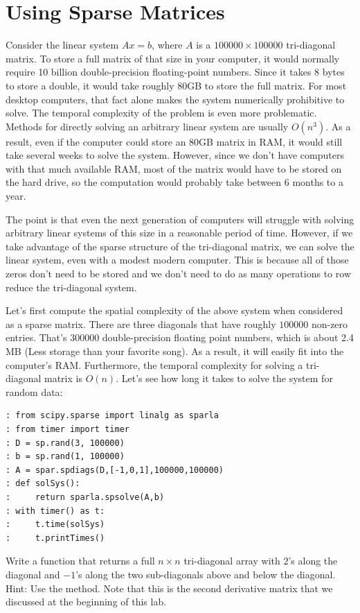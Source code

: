 \section*{Using Sparse Matrices}
Consider the linear system $A x = b$, where $A$ is a
 $100000\times 100000$ tri-diagonal matrix.  To store a full
matrix of that size in your computer, it would normally require 10
billion double-precision floating-point numbers.  Since it takes 8
bytes to store a double, it would take roughly 80GB to store the
full matrix.  For most desktop computers, that fact alone makes the
system numerically prohibitive to solve. 
The temporal complexity of the problem is even more problematic. 
Methods for directly solving an arbitrary linear system are usually $O(n^3)$.  
As a result, even if the computer could store an 80GB matrix in RAM, it
would still take several weeks to solve the system.  However, since
we don't have computers with that much available RAM, most of the
matrix would have to be stored on the hard drive, so the computation
would probably take between $6$ months to a year.

The point is that even the next generation of computers will
struggle with solving arbitrary linear systems of this size in a
reasonable period of time.  However, if we take advantage of the
sparse structure of the tri-diagonal matrix, we can solve the linear
system, even with a modest modern computer.  This is because all of
those zeros don't need to be stored and we don't need to do as many
operations to row reduce the tri-diagonal system.

Let's first compute the spatial complexity of the above system when
considered as a sparse matrix.  There are three diagonals that have
roughly $100000$ non-zero entries.  That's $300000$
double-precision floating point numbers, which is about 2.4 MB (Less
storage than your favorite song).  As a result, it will easily
fit into the computer's RAM.  Furthermore, the temporal complexity for solving
a tri-diagonal matrix is $O(n)$. Let's see how long it takes to
solve the system for random data:
\begin{lstlisting}
: from scipy.sparse import linalg as sparla
: from timer import timer
: D = sp.rand(3, 100000)
: b = sp.rand(1, 100000)
: A = spar.spdiags(D,[-1,0,1],100000,100000)
: def solSys():
:     return sparla.spsolve(A,b)
: with timer() as t:
:     t.time(solSys)
:     t.printTimes()
\end{lstlisting}

\begin{problem}
Write a function that returns a full $n\times n$
tri-diagonal array with $2$'s along the diagonal and $-1$'s along
the two sub-diagonals above and below the diagonal. 
Hint: Use the  method. 
Note that this is the second derivative matrix that we discussed at the beginning of this lab.
\end{problem}

